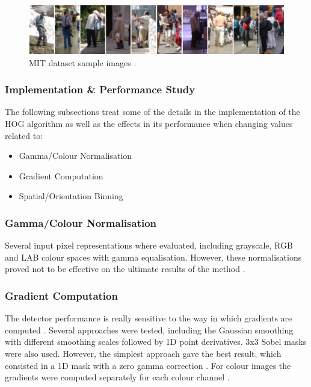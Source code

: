 \begin{figure}[!htbp]
  \begin{center}
  \includegraphics[width=\linewidth]{images/chapter6_mit_database.png}
  \end{center}
  \caption{MIT dataset sample images \cite{paper:dalal2005histograms}.}
  \label{fig:mit_dataset}
\end{figure}

\subsubsection{Implementation \& Performance Study}

The following subsections treat some of the details in the implementation of the HOG algorithm as well as the effects in its performance when changing values related to:

\begin{itemize}
	\item Gamma/Colour Normalisation
	\item Gradient Computation
    \item Spatial/Orientation Binning
\end{itemize}

\subsubsection{Gamma/Colour Normalisation}

Several input pixel representations where evaluated, including grayscale, RGB and LAB colour spaces with gamma equalisation. However, these normalisations proved not to be effective on the ultimate results of the method \cite{paper:dalal2005histograms}.

\subsubsection{Gradient Computation}

The detector performance is really sensitive to the way in which gradients are computed \cite{paper:dalal2005histograms}. Several approaches were tested, including the Gaussian smoothing with different smoothing scales followed by 1D point derivatives. 3x3 Sobel masks were also used. However, the simplest approach gave the best result, which consisted in a 1D mask with a zero gamma correction \cite{paper:dalal2005histograms}. For colour images the gradients were computed separately for each colour channel \cite{paper:dalal2005histograms}.

